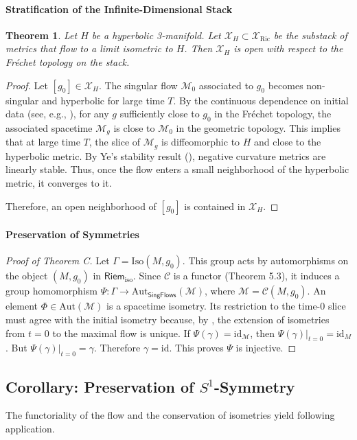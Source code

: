 \documentclass[11pt]{article}
\newtheorem{theorem}{Theorem}[section]
\newcommand{\RiemIso}{\mathsf{Riem}_{\mathrm{iso}}}
\newcommand{\SingFlows}{\mathsf{SingFlows}}
\begin{document}
\paragraph{Stratification of the Infinite-Dimensional Stack}
\begin{theorem}
Let $H$ be a hyperbolic 3-manifold. Let $\mathcal{X}_H \subset \mathcal{X}_{\mathrm{Ric}}$ be the substack of metrics that flow to a limit isometric to $H$. Then $\mathcal{X}_H$ is open with respect to the Fr\'echet topology on the stack.
\end{theorem}
\begin{proof}
Let $[g_0] \in \mathcal{X}_H$. The singular flow $\mathcal{M}_0$ associated to $g_0$ becomes non-singular and hyperbolic for large time $T$. By the  continuous dependence on initial data (see, e.g., \cite[Theorem 1.5]{BK19}), for any $g$ sufficiently close to $g_0$ in the Fr\'echet topology, the associated spacetime $\mathcal{M}_g$ is close to $\mathcal{M}_0$ in the geometric topology. This implies that at large time $T$, the slice of $\mathcal{M}_g$ is diffeomorphic to $H$ and close to the hyperbolic metric. By Ye's stability result (\cite[Theorem 2]{Ye93}), negative curvature metrics are linearly stable. Thus, once the flow enters a small neighborhood of the hyperbolic metric, it converges to it.

Therefore, an open neighborhood of $[g_0]$ is contained in $\mathcal{X}_H$.
\end{proof}
\paragraph{Preservation of Symmetries}
\begin{proof}[Proof of Theorem C]
Let $\Gamma = \mathrm{Iso}(M, g_0)$. This group acts by automorphisms on the object $(M, g_0)$ in $\RiemIso$. Since $\mathcal{C}$ is a functor (Theorem 5.3), it induces a group homomorphism $\Psi: \Gamma \longrightarrow\mathrm{Aut}_{\SingFlows}(\mathcal{M})$, where $\mathcal{M} = \mathcal{C}(M, g_0)$.
An element $\Phi \in \mathrm{Aut}(\mathcal{M})$ is a spacetime isometry. Its restriction to the time-0 slice must agree with the initial isometry because, by \cite[Theorem 1.3]{BK19}, the extension of isometries from $t=0$ to the maximal flow is unique.
If $\Psi(\gamma) = \mathrm{id}_{\mathcal{M}}$, then $\Psi(\gamma)|_{t=0} = \mathrm{id}_{M}$. But $\Psi(\gamma)|_{t=0} = \gamma$. Therefore $\gamma = \mathrm{id}$.
This proves $\Psi$ is injective.
\end{proof}
\subsection*{Corollary: Preservation of $S^1$-Symmetry}
The functoriality of the flow and the conservation of isometries yield following application.
\end{document}
